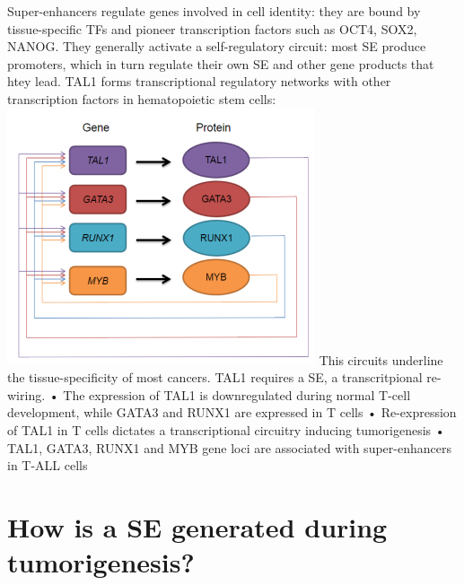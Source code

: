 Super-enhancers regulate genes involved in cell identity: they are bound by tissue-specific TFs and pioneer transcription factors such as OCT4, SOX2, NANOG. They generally activate a self-regulatory circuit: most SE produce promoters, which in turn regulate their own SE and other gene products that htey lead.
TAL1 forms transcriptional regulatory networks with other transcription factors in hematopoietic stem cells:
\includegraphics{../_resources/99fbd93b812d482263d53c442698a36a.png}
This circuits underline the tissue-specificity of most cancers. TAL1 requires a SE, a transcritpional re-wiring.
• The expression of TAL1 is downregulated during normal T-cell development, while GATA3 and RUNX1 are expressed in T cells
• Re-expression of TAL1 in T cells dictates a transcriptional circuitry inducing tumorigenesis
• TAL1, GATA3, RUNX1 and MYB gene loci are associated with super-enhancers in T-ALL cells

\hypertarget{how-is-a-se-generated-during-tumorigenesis}{%
\section{How is a SE generated during tumorigenesis?}\label{how-is-a-se-generated-during-tumorigenesis}}


